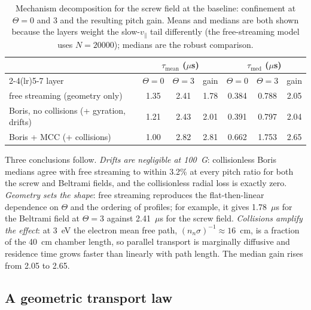 \documentclass[11pt]{article}
\newcommand{\us}{\ensuremath{\mu}s}
\begin{document}
\begin{table}[htbp]
\centering
\caption{Mechanism decomposition for the screw field at the baseline: confinement at $\Theta = 0$ and 3 and the resulting pitch gain. Means and medians are both shown because the layers weight the slow-$v_\parallel$ tail differently (the free-streaming model uses $N = 20000$); medians are the robust comparison.}
\label{tab:layers}
\begin{tabular}{lcccccc}
\toprule
 & \multicolumn{3}{c}{$\tau_{\mathrm{mean}}$ (\us)} & \multicolumn{3}{c}{$\tau_{\mathrm{med}}$ (\us)} \\
\cmidrule(lr){2-4}\cmidrule(lr){5-7}
layer & $\Theta = 0$ & $\Theta = 3$ & gain & $\Theta = 0$ & $\Theta = 3$ & gain \\
\midrule
free streaming (geometry only) & 1.35 & 2.41 & 1.78 & 0.384 & 0.788 & 2.05 \\
Boris, no collisions (+ gyration, drifts) & 1.21 & 2.43 & 2.01 & 0.391 & 0.797 & 2.04 \\
Boris + MCC (+ collisions) & 1.00 & 2.82 & 2.81 & 0.662 & 1.753 & 2.65 \\
\bottomrule
\end{tabular}
\end{table}

Three conclusions follow. \emph{Drifts are negligible at 100~G}: collisionless Boris medians agree with free streaming to within 3.2\% at every pitch ratio for both the screw and Beltrami fields, and the collisionless radial loss is exactly zero. \emph{Geometry sets the shape}: free streaming reproduces the flat-then-linear dependence on $\Theta$ and the ordering of profiles; for example, it gives 1.78~\us{} for the Beltrami field at $\Theta = 3$ against 2.41~\us{} for the screw field. \emph{Collisions amplify the effect}: at 3~eV the electron mean free path, $(n_n\sigma)^{-1} \approx 16$~cm, is a fraction of the 40~cm chamber length, so parallel transport is marginally diffusive and residence time grows faster than linearly with path length. The median gain rises from 2.05 to 2.65.

\subsection{A geometric transport law}
\label{sec:law}
\end{document}

